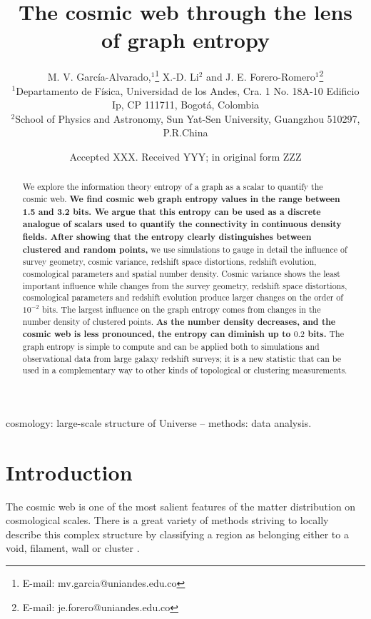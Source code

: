 \documentclass[fleqn,usenatbib]{mnras}
\title[Cosmic Web Graph Entropy]{The cosmic web through the lens of graph entropy}
\author[Garc\'ia-Alvarado et al.]{
M. V. Garc\'ia-Alvarado,$^{1}$\thanks{E-mail: mv.garcia@uniandes.edu.co}
X.-D. Li$^{2}$
and J. E. Forero-Romero$^{1}$\thanks{E-mail: je.forero@uniandes.edu.co}
\\
$^{1}$Departamento de F\'isica, Universidad de los Andes, Cra. 1 No. 18A-10 Edificio Ip, CP 111711, Bogot\'a, Colombia\\
$^{2}$School of Physics and Astronomy, Sun Yat-Sen University, Guangzhou 510297, P.R.China\\
}
\date{Accepted XXX. Received YYY; in original form ZZZ}
\begin{document}
\label{firstpage}
\pagerange{\pageref{firstpage}--\pageref{lastpage}}
\maketitle

\begin{abstract}
  We explore the information theory entropy of a graph as a scalar to
  quantify the cosmic web. 
  \textbf{We find cosmic web graph entropy values in the range between 1.5 and 3.2 bits. We argue that this entropy can be
  used as a discrete analogue of scalars used to quantify the connectivity in continuous density fields. 
  After showing that the entropy clearly distinguishes between clustered and random points, }
  we use simulations to gauge in detail the influence of survey geometry, cosmic variance, 
  redshift space distortions, redshift evolution, cosmological parameters and 
  spatial number density.  
  Cosmic variance shows the least important influence while
  changes from the survey geometry, redshift space distortions, cosmological 
  parameters and redshift evolution produce larger changes on the
  order of $10^{-2}$ bits.
  The largest influence on the graph entropy comes from changes in the 
  number density of clustered points.
  \textbf{As the number density decreases, and the cosmic web is less pronounced, the entropy can diminish up to $0.2$ bits.}
 The graph entropy is simple to compute and can be applied both to simulations and observational data from large galaxy redshift surveys; it is a new statistic that can be used in a complementary way to other kinds of topological or clustering measurements. 
\end{abstract}
\begin{keywords}
cosmology: large-scale structure of Universe -- methods: data analysis.
\end{keywords}


\section{Introduction}

The cosmic web is one of the most salient features of the matter distribution
on cosmological scales. 
There is a great variety of methods striving to locally describe this complex 
structure by classifying a region as belonging either
to a void, filament, wall or cluster \citep{2018MNRAS.473.1195L}. 
\end{document}
